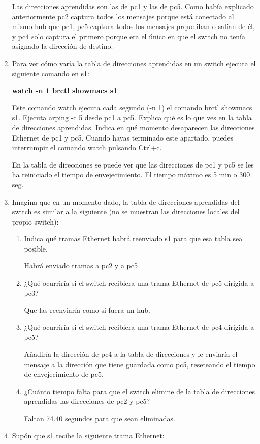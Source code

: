 \documentclass[12pt, a4paper]{report}
\begin{document}
\begin{enumerate}
	Las direcciones aprendidas son las de pc1 y las de pc5. Como había explicado anteriormente pc2 captura todos los mensajes porque está conectado al mismo hub que pc1, pc5 captura todos los mensajes prque iban o salían de él, y pc4 solo captura el primero porque era el único en que el switch no tenía asignado la dirección de destino.
	\item Para ver cómo varía la tabla de direcciones aprendidas en un switch ejecuta el siguiente comando en s1:
	
	\textbf{\quad \quad watch -n 1 brctl showmacs s1}
	
	Este comando watch ejecuta cada segundo (-n 1) el comando brctl showmacs s1. Ejecuta arping -c 5
	desde pc1 a pc5. Explica qué es lo que ves en la tabla de direcciones aprendidas. Indica en qué momento
	desaparecen las direcciones Ethernet de pc1 y pc5. Cuando hayas terminado este apartado, puedes interrumpir
	el comando watch pulsando Ctrl+c.
	
	En la tabla de direcciones se puede ver que las direcciones de pc1 y pc5 se les ha reiniciado el tiempo de envejecimiento. El tiempo máximo es 5 min o 300 seg.
	\item Imagina que en un momento dado, la tabla de direcciones aprendidas del switch es similar a la siguiente (no
	se muestran las direcciones locales del propio switch):
	\begin{enumerate}[label=\alph*]
		\item Indica qué tramas Ethernet habrá reenviado s1 para que esa tabla sea posible.
		
		Habrá enviado tramas a pc2 y a pc5
		\item ¿Qué ocurriría si el switch recibiera una trama Ethernet de pc5 dirigida a pc3?
		
		Que las reenviaría como si fuera un hub.
		\item ¿Qué ocurriría si el switch recibiera una trama Ethernet de pc4 dirigida a pc5?
		
		Añadiría la dirección de pc4 a la tabla de direcciones y le enviaría el mensaje a la dirección que tiene guardada como pc5, reseteando el tiempo de envejecimiento de pc5.
		\item ¿Cuánto tiempo falta para que el switch elimine de la tabla de direcciones aprendidas las direcciones de
		pc2 y pc5?
		
		Faltan 74.40 segundos para que sean eliminadas.
	\end{enumerate}
	\item Supón que s1 recibe la siguiente trama Ethernet:
	

\end{enumerate}
\end{document}
